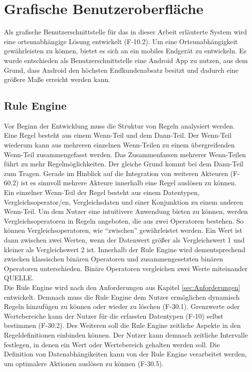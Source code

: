 \section{Grafische Benutzeroberfläche}
Als grafische Benutzerschnittstelle für das in dieser Arbeit erläuterte System wird eine ortsunabhängige Lösung entwickelt (F-10.2). Um eine Ortsunabhängigkeit gewährleisten zu können, bietet es sich an ein mobiles Endgerät zu entwickeln. Es wurde  entschieden als Benutzerschnittstelle eine Android App zu nutzen, aus dem Grund, dass Android den höchsten Endkundenabsatz besitzt \cite{statista:marktanteileandroid} und dadurch eine größere Maße erreicht werden kann.
\subsection{Rule Engine}
Vor Beginn der Entwicklung muss die Struktur von Regeln analysiert werden. Eine Regel besteht aus einem Wenn-Teil und dem Dann-Teil. Der Wenn-Teil wiederum kann aus mehreren einzelnen Wenn-Teilen zu einem übergreifenden Wenn-Teil zusammengefasst werden. Das Zusammenfassen mehrerer Wenn-Teilen führt zu mehr Regelmöglichkeiten. Der gleiche Grund kommt bei dem Dann-Teil zum Tragen. Gerade im Hinblick auf die Integration von weiteren Akteuren (F-60.2) ist es sinnvoll mehrere Akteure innerhalb eine Regel auslösen zu können.\\
Ein einzelner Wenn-Teil der Regel besteht aus einem Datentypen, Vergleichsoperator/en, Vergleichsdaten und einer Konjunktion zu einem anderen Wenn-Teil. Um dem Nutzer eine intuitivere Anwendung bieten zu können, werden Vergleichsoperatoren in Regeln angeboten, die aus zwei Operatoren bestehen. So können Vergleichsoperatoren, wie ``zwischen'' gewährleistet werden. Ein Wert ist dann zwischen zwei Werten, wenn der Datenwert größer als Vergleichswert 1 und kleiner als Vergleichswert 2 ist. Innerhalb der Rule Engine wird dementsprechend zwischen klassischen binären Operatoren und zusammengesetzten binären Operatoren unterschieden. Binäre Operatoren vergleichen zwei Werte miteinander QUELLE.\\
Die Rule Engine wird nach den Anforderungen aus Kapitel \ref{sec:Anforderungen} entwickelt. Demnach muss die Rule Engine dem Nutzer ermöglichen dynamisch Regeln hinzufügen zu können oder wieder zu löschen (F-30.1). Grenzwerte oder Wertebereiche kann der Nutzer für die erfassten Datentypen (F-10) selbst bestimmen (F-30.2). Des Weiteren soll die Rule Engine zeitliche Aspekte in den Regeldefinitionen einbinden können. Der Nutzer kann demnach zeitliche Intervalle festlegen, in denen ein Wert oder Wertebereich gehalten werden soll. Die Definition von Datenabhängikeiten kann von der Rule Engine verarbeitet werden, um optimalere Aktionen auslösen zu können (F-30.5).\\
